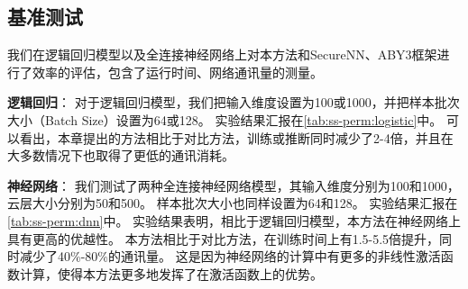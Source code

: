 \subsection{基准测试}
我们在逻辑回归模型以及全连接神经网络上对本方法和SecureNN、ABY3框架进行了效率的评估，包含了运行时间、网络通讯量的测量。

\textbf{逻辑回归}：
对于逻辑回归模型，我们把输入维度设置为100或1000，并把样本批次大小（Batch Size）设置为64或128。
实验结果汇报在\ref{tab:ss-perm:logistic}中。
可以看出，本章提出的方法相比于对比方法，训练或推断同时减少了2-4倍，并且在大多数情况下也取得了更低的通讯消耗。
%



\textbf{神经网络}：
我们测试了两种全连接神经网络模型，其输入维度分别为100和1000，云层大小分别为50和500。
样本批次大小也同样设置为64和128。
实验结果汇报在\ref{tab:ss-perm:dnn}中。
%
实验结果表明，相比于逻辑回归模型，本方法在神经网络上具有更高的优越性。
本方法相比于对比方法，在训练时间上有1.5-5.5倍提升，同时减少了40\%-80\%的通讯量。
这是因为神经网络的计算中有更多的非线性激活函数计算，使得本方法更多地发挥了在激活函数上的优势。
%



